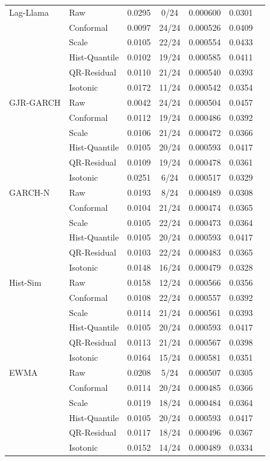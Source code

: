 \begin{table}[H]
\begin{tabular}{llccccc}
\midrule
Lag-Llama & Raw & 0.0295 & 0/24 & 0.000600 & 0.0301 \\
 & Conformal & 0.0097 & 24/24 & 0.000526 & 0.0409 \\
 & Scale & 0.0105 & 22/24 & 0.000554 & 0.0433 \\
 & Hist-Quantile & 0.0102 & 19/24 & 0.000585 & 0.0411 \\
 & QR-Residual & 0.0110 & 21/24 & 0.000540 & 0.0393 \\
 & Isotonic & 0.0172 & 11/24 & 0.000542 & 0.0354 \\
\midrule
GJR-GARCH & Raw & 0.0042 & 24/24 & 0.000504 & 0.0457 \\
 & Conformal & 0.0112 & 19/24 & 0.000486 & 0.0392 \\
 & Scale & 0.0106 & 21/24 & 0.000472 & 0.0366 \\
 & Hist-Quantile & 0.0105 & 20/24 & 0.000593 & 0.0417 \\
 & QR-Residual & 0.0109 & 19/24 & 0.000478 & 0.0361 \\
 & Isotonic & 0.0251 & 6/24 & 0.000517 & 0.0329 \\
\midrule
GARCH-N & Raw & 0.0193 & 8/24 & 0.000489 & 0.0308 \\
 & Conformal & 0.0104 & 21/24 & 0.000474 & 0.0365 \\
 & Scale & 0.0105 & 22/24 & 0.000473 & 0.0364 \\
 & Hist-Quantile & 0.0105 & 20/24 & 0.000593 & 0.0417 \\
 & QR-Residual & 0.0103 & 22/24 & 0.000483 & 0.0365 \\
 & Isotonic & 0.0148 & 16/24 & 0.000479 & 0.0328 \\
\midrule
Hist-Sim & Raw & 0.0158 & 12/24 & 0.000566 & 0.0356 \\
 & Conformal & 0.0108 & 22/24 & 0.000557 & 0.0392 \\
 & Scale & 0.0114 & 21/24 & 0.000561 & 0.0393 \\
 & Hist-Quantile & 0.0105 & 20/24 & 0.000593 & 0.0417 \\
 & QR-Residual & 0.0113 & 21/24 & 0.000567 & 0.0398 \\
 & Isotonic & 0.0164 & 15/24 & 0.000581 & 0.0351 \\
\midrule
EWMA & Raw & 0.0208 & 5/24 & 0.000507 & 0.0305 \\
 & Conformal & 0.0114 & 20/24 & 0.000485 & 0.0366 \\
 & Scale & 0.0119 & 18/24 & 0.000484 & 0.0364 \\
 & Hist-Quantile & 0.0105 & 20/24 & 0.000593 & 0.0417 \\
 & QR-Residual & 0.0117 & 18/24 & 0.000496 & 0.0367 \\
 & Isotonic & 0.0152 & 14/24 & 0.000489 & 0.0334 \\
\bottomrule
\end{tabular}
\end{table}